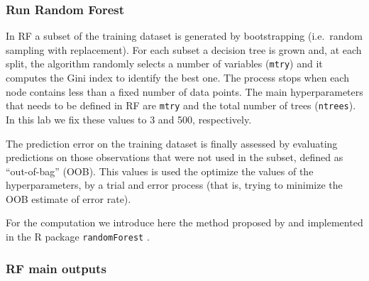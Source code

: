 \documentclass[
]{article}
\newenvironment{Shaded}{\begin{snugshade}}{\end{snugshade}}
\newcommand{\AttributeTok}[1]{\textcolor[rgb]{0.13,0.29,0.53}{#1}}
\newcommand{\CommentTok}[1]{\textcolor[rgb]{0.56,0.35,0.01}{\textit{#1}}}
\newcommand{\ConstantTok}[1]{\textcolor[rgb]{0.56,0.35,0.01}{#1}}
\newcommand{\DecValTok}[1]{\textcolor[rgb]{0.00,0.00,0.81}{#1}}
\newcommand{\DocumentationTok}[1]{\textcolor[rgb]{0.56,0.35,0.01}{\textbf{\textit{#1}}}}
\newcommand{\FunctionTok}[1]{\textcolor[rgb]{0.13,0.29,0.53}{\textbf{#1}}}
\newcommand{\NormalTok}[1]{#1}
\newcommand{\OtherTok}[1]{\textcolor[rgb]{0.56,0.35,0.01}{#1}}
\newcommand{\SpecialCharTok}[1]{\textcolor[rgb]{0.81,0.36,0.00}{\textbf{#1}}}
\begin{document}
\subsubsection{Run Random Forest}\label{run-random-forest}

In RF a subset of the training dataset is generated by bootstrapping (i.e.~random sampling with replacement).
For each subset a decision tree is grown and, at each split, the algorithm randomly selects a number of variables (\texttt{mtry}) and it computes the Gini index to identify the best one.
The process stops when each node contains less than a fixed number of data points.
The main hyperparameters that needs to be defined in RF are \texttt{mtry} and the total number of trees (\texttt{ntrees}).
In this lab we fix these values to 3 and 500, respectively.

The prediction error on the training dataset is finally assessed by evaluating predictions on those observations that were not used in the subset, defined as ``out-of-bag'' (OOB).
This values is used the optimize the values of the hyperparameters, by a trial and error process (that is, trying to minimize the OOB estimate of error rate).

For the computation we introduce here the method proposed by \citet{breiman_random_2001} and implemented in the R package \texttt{randomForest} \citep{RF_library}.

\begin{Shaded}
\end{Shaded}

\subsubsection{RF main outputs}\label{rf-main-outputs}
\end{document}
